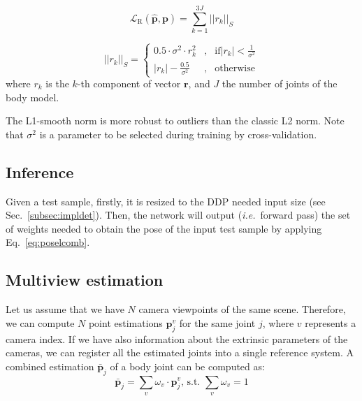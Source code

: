 \documentclass[review,12pt,3p]{elsarticle}
\def \ie{\textit{i.e.}}
\begin{document}
\begin{equation}\label{eq:regLoss}
   \mathcal{L}_{\text{R}}(\mathbf{\hat{p}},\mathbf{p}) = \sum_{k=1}^{3J} ||r_k||_{S}
\end{equation}

\begin{equation}\label{eq:l1smoothnorm}
  ||r_{k}||_S=
      \left\{
                \begin{array}{lcl}
                  0.5 \cdot \sigma^2 \cdot r_{k}^2 &,& \mathrm{if} |r_{k}| < \frac{1}{\sigma^2} \\
                  |r_{k}| - \frac{0.5}{\sigma^2} &,& \mathrm{otherwise}
                \end{array}
              \right.
\end{equation}
where $r_{k}$ is the $k$-th component of vector $\mathbf{r}$, and $J$  the number of joints of the body model.

The L1-smooth norm is more robust to outliers than the classic L2 norm. Note that $\sigma^2$ is a parameter to be selected during training by cross-validation.


\subsection{Inference}\label{subsec:DDPinfer}
Given a test sample, firstly, it is resized to the DDP needed input size (see Sec.~\ref{subsec:impldet}). Then, the network will output (\ie~forward pass) the set of weights needed to obtain the pose of the input test sample by applying Eq.~\ref{eq:poselcomb}.

\subsection{Multiview estimation} \label{subsec:multiview}
Let us assume that we have $N$ camera viewpoints of the same scene. Therefore, we can compute $N$ point estimations $\mathbf{p}_j^v$ for the same joint $j$, where $v$ represents a camera index. If we have also information about the extrinsic parameters of the cameras, we can register all the estimated joints into a single reference system. A combined estimation $\mathbf{\bar{p}}_j$ of a body joint can be computed as:
\begin{equation}\label{eq:mcpt}
    \mathbf{\bar{p}}_j = \sum_v \omega_v \cdot \mathbf{p}_j^v \text{, s.t. } \sum_v \omega_v = 1
\end{equation}
\end{document}
